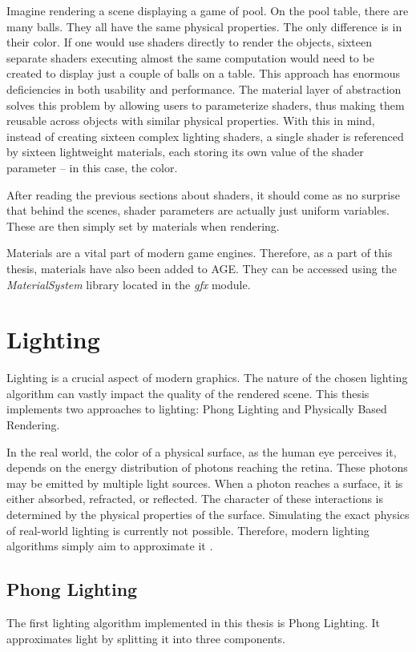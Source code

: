 \documentclass[
  digital,     %
  oneside,     %
  nosansbold,  %
  nocolorbold, %
  lof,         %
  lot,         %
]{fithesis4}
\begin{document}
Imagine rendering a scene displaying a game of pool. On the pool table, there are many balls.
They all have the same physical properties. The only difference is in their color.
If one would use shaders directly to render the objects, sixteen separate
shaders executing almost the same computation would need to be created to display just a couple of balls on a table.
This approach has enormous deficiencies in both usability and performance.
The material layer of abstraction solves this problem by allowing users to parameterize shaders,
thus making them reusable across objects with similar physical properties. With this in mind, instead of creating sixteen
complex lighting shaders, a single shader is referenced by sixteen lightweight materials, each storing its own value
of the shader parameter -- in this case, the color.

After reading the previous sections about shaders, it should come as no surprise that behind the scenes,
shader parameters are actually just uniform variables. These are then simply set by materials when rendering.

Materials are a vital part of modern game engines. Therefore, as a part of this thesis, materials have also been added to AGE.
They can be accessed using the \textit{MaterialSystem} library located in the \textit{gfx} module.

\chapter{Lighting}\label{chap:lighting}
Lighting is a crucial aspect of modern graphics. The nature of the chosen lighting algorithm can vastly impact
the quality of the rendered scene. This thesis implements two approaches to lighting: Phong Lighting and
Physically Based Rendering.

In the real world, the color of a physical surface, as the human eye perceives it, depends on the
energy distribution of photons reaching the retina. These photons may be emitted by multiple light sources.
When a photon reaches a surface, it is either absorbed, refracted, or reflected.
The character of these interactions is determined by the physical properties of the surface.
Simulating the exact physics of real-world lighting is currently not possible. Therefore,
modern lighting algorithms simply aim to approximate it \cite[p.207]{opengl-book}.

\section{Phong Lighting}
The first lighting algorithm implemented in this thesis is Phong Lighting.
It approximates light by splitting it into three components.
\end{document}
